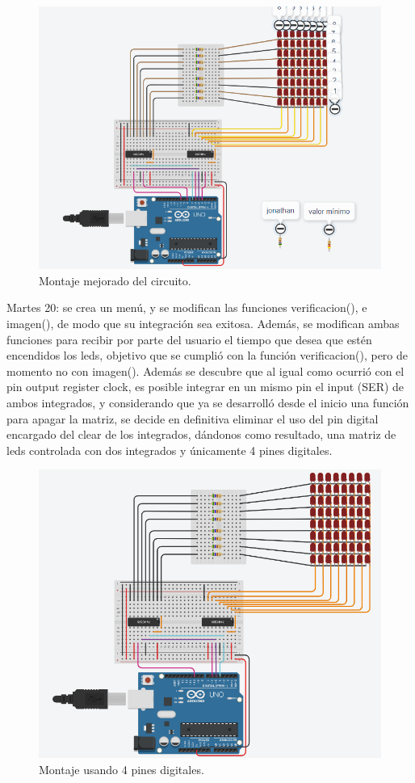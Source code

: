 \documentclass{article}
\begin{document}
 \begin{figure}[h]
\includegraphics[scale=0.5]{montaje2.png}
\centering
\caption{Montaje mejorado del circuito.}
\label{fig:montaje2}
\end{figure}

\newpage
Martes 20: se crea un menú, y se modifican las funciones verificacion(), e imagen(),  de modo que su integración sea exitosa. Además, se modifican ambas funciones para recibir por parte del usuario el tiempo que desea que estén encendidos los leds, objetivo que se cumplió con la función verificacion(), pero de momento no con imagen(). Además se descubre que al igual como ocurrió con el pin output register clock, es posible integrar en un mismo pin el input (SER) de ambos integrados, y considerando que ya se desarrolló desde el inicio una función para apagar la matriz, se decide en definitiva eliminar el uso del pin digital encargado del clear de los integrados, dándonos como resultado, una matriz de leds controlada con  dos integrados y únicamente 4 pines digitales.

 \begin{figure}[h]
\includegraphics[scale=0.4]{montaje 4 final.png}
\centering
\caption{Montaje usando 4 pines digitales.}
\label{fig:montaje4}
\end{figure}
\end{document}
